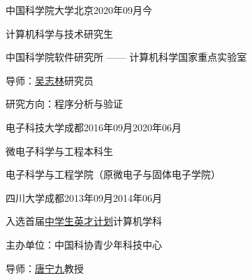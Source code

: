 
\begin{eduitem}{中国科学院大学}{北京}{2020年09月}{今}
    \item 计算机科学与技术研究生
    \item 中国科学院软件研究所 —— 计算机科学国家重点实验室
    \item 导师：\href{http://lcs.ios.ac.cn/~wuzl/}{吴志林}研究员
    \item 研究方向：程序分析与验证
\end{eduitem}

\begin{eduitem}{电子科技大学}{成都}{2016年09月}{2020年06月}
\item 微电子科学与工程本科生
\item 电子科学与工程学院（原微电子与固体电子学院）
\end{eduitem}

\begin{eduitem}{四川大学}{成都}{2013年09月}{2014年06月}
\item 入选首届\href{https://www.ycjh.org.cn/}{中学生英才计划}计算机学科
\item 主办单位：中国科协青少年科技中心
\item 导师：\href{http://cs.scu.edu.cn/info/1074/3930.htm}{唐宁九}教授
\end{eduitem}


\endinput